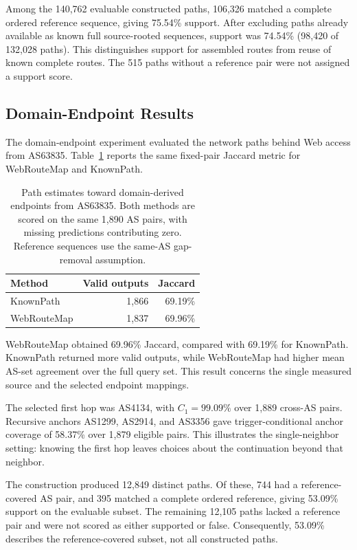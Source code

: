 \documentclass[sigconf,anonymous,review]{acmart}
\newcommand{\sys}{\mbox{WebRouteMap}\xspace}
\begin{document}
Among the 140,762 evaluable constructed paths, 106,326 matched a complete
ordered reference sequence, giving 75.54\% support. After excluding paths
already available as known full source-rooted sequences, support was
74.54\% (98,420 of 132,028 paths). This distinguishes support for assembled
routes from reuse of known complete routes. The 515 paths without a
reference pair were not assigned a support score.

\subsection{Domain-Endpoint Results}
\label{sec:web_validation}

The domain-endpoint experiment evaluated the network paths behind Web access
from AS63835. Table~\ref{tab:web_results} reports the same fixed-pair Jaccard
metric for \sys and KnownPath.

\begin{table}[t]
\centering
\caption{Path estimates toward domain-derived endpoints from AS63835.
Both methods are scored on the same 1,890 AS pairs, with missing predictions
contributing zero. Reference sequences use the same-AS gap-removal assumption.}
\label{tab:web_results}
\footnotesize
\setlength{\tabcolsep}{3pt}
\begin{tabularx}{\columnwidth}{@{}Xrr@{}}
\toprule
Method & Valid outputs & Jaccard\\
\midrule
KnownPath & 1,866 & 69.19\%\\
\sys & 1,837 & 69.96\%\\
\bottomrule
\end{tabularx}
\end{table}

\sys obtained 69.96\% Jaccard, compared with 69.19\% for KnownPath.
KnownPath returned more valid outputs, while \sys had higher mean
AS-set agreement over the full query set. This result concerns the
single measured source and the selected endpoint mappings.

The selected first hop was AS4134, with $C_1=99.09\%$ over 1,889 cross-AS
pairs. Recursive anchors AS1299, AS2914, and AS3356 gave trigger-conditional
anchor coverage of 58.37\% over 1,879 eligible pairs. This illustrates the
single-neighbor setting: knowing the first hop leaves choices about the
continuation beyond that neighbor.

The construction produced 12,849 distinct paths. Of these, 744 had a
reference-covered AS pair, and 395 matched a complete ordered reference,
giving 53.09\% support on the evaluable subset. The remaining 12,105 paths
lacked a reference pair and were not scored as either supported or false.
Consequently, 53.09\% describes the reference-covered subset, not all
constructed paths.
\end{document}

